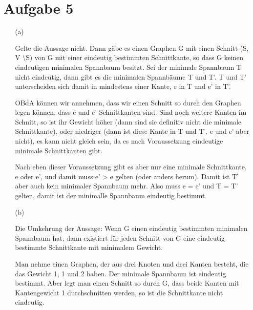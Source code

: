\documentclass{article}
\begin{document}
\section*{Aufgabe 5}

\begin{enumerate} 
\item[(a)] 

Gelte die Aussage nicht. Dann gäbe es einen Graphen G mit einen 
Schnitt (S, V \textbackslash S) von G mit einer eindeutig 
bestimmten Schnittkante, so dass G keinen eindeutigen minimalen 
Spannbaum besitzt. Sei der minimale Spannbaum T nicht eindeutig, 
dann gibt es die minimalen Spannbäume T und T'. T und T' 
unterscheiden sich damit in mindestens einer Kante, e in T und e' 
in T'. 

OBdA können wir annehmen, dass wir einen Schnitt so durch den 
Graphen legen können, dass e und e' Schnittkanten sind. Sind noch 
weitere Kanten im Schnitt, so ist ihr Gewicht höher (dann sind sie 
definitiv nicht die minimale Schnittkante), oder niedriger (dann 
ist diese Kante in T und T', e und e' aber nicht), es kann nicht 
gleich sein, da es nach Voraussetzung eindeutige minimale 
Schnittkanten gibt.

Nach eben dieser Voraussetzung gibt es aber nur eine minimale 
Schnittkante, e oder e', und damit muss e' > e gelten (oder anders 
herum). Damit ist T' aber auch kein minimaler Spannbaum mehr.
Also muss e = e' und T = T' gelten, damit ist der minimalle Spannbaum eindeutig bestimmt.


\item[(b)]

Die Umkehrung der Aussage: Wenn G einen eindeutig bestimmten 
minimalen Spannbaum hat, dann existiert für jeden Schnitt von G 
eine eindeutig bestimmte Schnittkante mit minimalem Gewicht.

Man nehme einen Graphen, der aus drei Knoten und drei Kanten 
besteht, die das Gewicht 1, 1 und 2 haben. Der minimale Spannbaum 
ist eindeutig bestimmt. Aber legt man einen Schnitt so durch G, 
dass beide Kanten mit Kantengewicht 1 durchschnitten werden, so 
ist die Schnittkante nicht eindeutig.

\end{enumerate}
\end{document}
